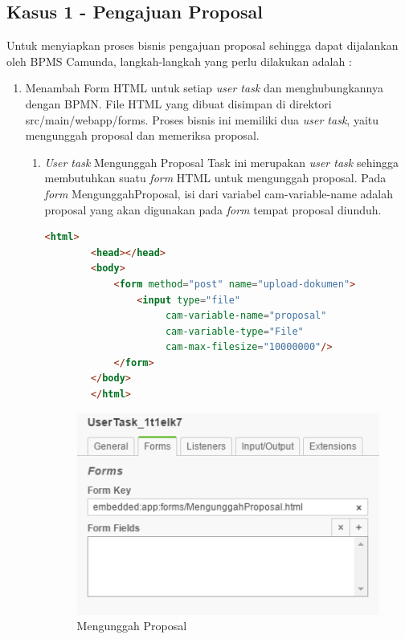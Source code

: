 \subsection{Kasus 1 - Pengajuan Proposal}
\label{hasilstudi_bpms_kasus1}
Untuk menyiapkan proses bisnis pengajuan proposal sehingga dapat dijalankan oleh BPMS Camunda, langkah-langkah yang perlu dilakukan adalah :

\begin{enumerate}
	\item Menambah Form HTML untuk setiap \textit{user task} dan menghubungkannya dengan BPMN. File HTML yang dibuat disimpan di direktori src/main/webapp/forms. Proses bisnis ini memiliki dua \textit{user task}, yaitu mengunggah proposal dan memeriksa proposal. 
	
\begin{enumerate}
	\item \textit{User task} Mengunggah Proposal
	Task ini merupakan \textit{user task} sehingga membutuhkan suatu \textit{form} HTML untuk mengunggah proposal. Pada \textit{form} MengunggahProposal, isi dari variabel cam-variable-name adalah proposal yang akan digunakan pada \textit{form} tempat proposal diunduh.

	
	\begin{lstlisting}[language=html,basicstyle=\tiny,caption=MengunggahProposal.html]
		<html>
		<head></head>
		<body>
			<form method="post" name="upload-dokumen">
				<input type="file"
					 cam-variable-name="proposal" 
					 cam-variable-type="File"
					 cam-max-filesize="10000000"/>
			</form>
		</body>
		</html>
	\end{lstlisting}
	
		\begin{figure}[H]
			\centering
			\includegraphics[scale=1]{Gambar/Bab-3/Kasus1/2form}
			\caption{Mengunggah Proposal} 
			\label{fig:pengajuanproposal_mengunggahproposalform}
	\end{figure}



\end{enumerate}
\end{enumerate}
